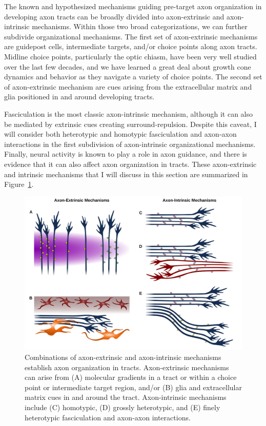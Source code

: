 \label{sec:MoleculesMechanisms}
The known and hypothesized mechanisms guiding pre-target axon organization in developing axon tracts can be broadly divided into axon-extrinsic and axon-intrinsic mechanisms. 
Within those two broad categorizations, we can further subdivide organizational mechanisms.
The first set of axon-extrinsic mechanisms are guidepost cells, intermediate targets, and/or choice points along axon tracts.
Midline choice points, particularly the optic chiasm, have been very well studied over the last few decades, and we have learned a great deal about growth cone dynamics and behavior as they navigate a variety of choice points.
The second set of axon-extrinsic mechanism are cues arising from the extracellular matrix and glia positioned in and around developing tracts.

Fasciculation is the most classic axon-intrinsic mechanism, although it can also be mediated by extrinsic cues creating surround-repulsion.
Despite this caveat, I will consider both heterotypic and homotypic fasciculation and axon-axon interactions in the first subdivision of axon-intrinsic organizational mechanisms.
Finally, neural activity is known to play a role in axon guidance, and there is evidence that it can also affect axon organization in tracts.
These axon-extrinsic and intrinsic mechanisms that I will discuss in this section are summarized in Figure~\ref{AxonOrg_Mechs}.
\begin{figure}[hbtp]
	\begin{center}
	\includegraphics[width=\textwidth]{figures/AxonOrg_Mechs.svg}
	\caption[Common Mechanisms of Axon Organization in Tracts]{Combinations of axon-extrinsic and axon-intrinsic mechanisms establish axon organization in tracts. Axon-extrinsic mechanisms can arise from (A) molecular gradients in a tract or within a choice point or intermediate target region, and/or (B) glia and extracellular matrix cues in and around the tract. Axon-intrinsic mechanisms include (C) homotypic, (D) grossly heterotypic, and (E) finely heterotypic fasciculation and axon-axon interactions. \label{AxonOrg_Mechs}}
	\end{center}
\end{figure}